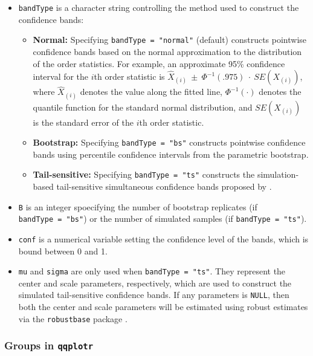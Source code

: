 \begin{itemize}
\item
  \texttt{bandType} is a character string controlling the method used to
  construct the confidence bands:

  \begin{itemize}
  \tightlist
  \item
    \textbf{Normal:} Specifying \texttt{bandType\ =\ "normal"} (default)
    constructs pointwise confidence bands based on the normal
    approximation to the distribution of the order statistics. For
    example, an approximate 95\% confidence interval for the \(i\)th
    order statistic is
    \linebreak \(\widehat{X}_{(i)}~\pm~\Phi^{-1}(.975)~\cdot~SE(X_{(i)})\),
    where \(\widehat{X}_{(i)}\) denotes the value along the fitted line,
    \(\Phi^{-1}(\cdot)\) denotes the quantile function for the standard
    normal distribution, and \(SE(X_{(i)})\) is the standard error of
    the \(i\)th order statistic.
  \item
    \textbf{Bootstrap:} Specifying \texttt{bandType\ =\ "bs"} constructs
    pointwise confidence bands using percentile confidence intervals
    from the parametric bootstrap.
  \item
    \textbf{Tail-sensitive:} Specifying \texttt{bandType\ =\ "ts"}
    constructs the simulation-based tail-sensitive simultaneous
    confidence bands proposed by \citet{Aldor-Noiman2013-xw}.
  \end{itemize}
\item
  \texttt{B} is an integer spoecifying the number of bootstrap
  replicates (if \texttt{bandType\ =\ "bs"}) or the number of simulated
  samples (if \texttt{bandType\ =\ "ts"}).
\item
  \texttt{conf} is a numerical variable setting the confidence level of
  the bands, which is bound between 0 and 1.
\item
  \texttt{mu} and \texttt{sigma} are only used when
  \texttt{bandType\ =\ "ts"}. They represent the center and scale
  parameters, respectively, which are used to construct the simulated
  tail-sensitive confidence bands. If any parameters is \texttt{NULL},
  then both the center and scale parameters will be estimated using
  robust estimates via the \texttt{robustbase} package
  \citep{robustbase}.
\end{itemize}

\subsubsection{\texorpdfstring{Groups in
\texttt{qqplotr}}{Groups in qqplotr}}\label{groups-in-qqplotr}

